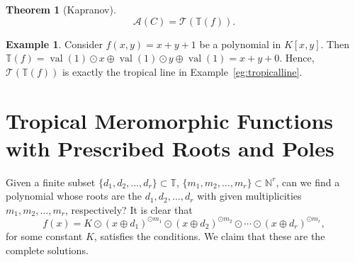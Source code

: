 \documentclass{amsart}
\newtheorem{thm}{Theorem}[section]
\theoremstyle{definition}
\newtheorem{eg}{Example}[section]
\theoremstyle{remark}
\begin{document}
\begin{thm}[Kapranov]
\[
{\mathcal{A}}(C) = {\mathcal{T}}({\mathbb{T}}(f)).
\]
\end{thm}

\begin{eg}
Consider $f(x,y) = x + y + 1$ be a polynomial in $K[x,y]$. Then ${\mathbb{T}}(f) = \operatorname{val}(1){\odot} x {\oplus} \operatorname{val}(1){\odot} y   {\oplus} \operatorname{val}(1) = x + y + 0$. Hence, ${\mathcal{T}}({\mathbb{T}}(f))$ is exactly the tropical line in Example~\ref{eg:tropicalline}.
\end{eg}

\section{Tropical Meromorphic Functions with Prescribed Roots and Poles}\label{s:prescribed}
Given a finite subset $\{d_1, d_2, \ldots, d_r\} \subset {\mathbb{T}}$, $\{m_1, m_2, \ldots, m_r\} \subset {\mathbb{N}}^r$, can we find a polynomial whose roots are the $d_1, d_2, \ldots, d_r$ with given multiplicities $m_1, m_2, \ldots, m_r$, respectively? It is clear that
\[
f(x) = K{\odot} (x {\oplus} d_1)^{{\odot} m_1} {\odot} (x {\oplus} d_2)^{{\odot} m_2} {\odot} \cdots {\odot}  (x {\oplus} d_r)^{{\odot} m_r},
\]
for some constant $K$, satisfies the conditions. We claim that these are the complete solutions.
\end{document}
